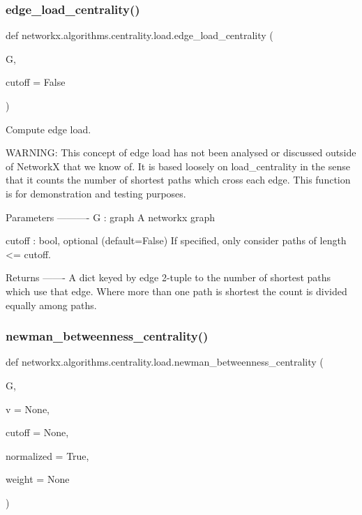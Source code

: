 \subsubsection{\texorpdfstring{edge\+\_\+load\+\_\+centrality()}{edge\_load\_centrality()}}
{\footnotesize\ttfamily def networkx.\+algorithms.\+centrality.\+load.\+edge\+\_\+load\+\_\+centrality (\begin{DoxyParamCaption}\item[{}]{G,  }\item[{}]{cutoff = {\ttfamily False} }\end{DoxyParamCaption})}

\begin{DoxyVerb}Compute edge load.

WARNING: This concept of edge load has not been analysed
or discussed outside of NetworkX that we know of.
It is based loosely on load_centrality in the sense that
it counts the number of shortest paths which cross each edge.
This function is for demonstration and testing purposes.

Parameters
----------
G : graph
    A networkx graph

cutoff : bool, optional (default=False)
    If specified, only consider paths of length <= cutoff.

Returns
-------
A dict keyed by edge 2-tuple to the number of shortest paths
which use that edge. Where more than one path is shortest
the count is divided equally among paths.
\end{DoxyVerb}
 \mbox{\label{namespacenetworkx_1_1algorithms_1_1centrality_1_1load_aa6e723e954aa51a2258ec99854f063c0}} 
\subsubsection{\texorpdfstring{newman\+\_\+betweenness\+\_\+centrality()}{newman\_betweenness\_centrality()}}
{\footnotesize\ttfamily def networkx.\+algorithms.\+centrality.\+load.\+newman\+\_\+betweenness\+\_\+centrality (\begin{DoxyParamCaption}\item[{}]{G,  }\item[{}]{v = {\ttfamily None},  }\item[{}]{cutoff = {\ttfamily None},  }\item[{}]{normalized = {\ttfamily True},  }\item[{}]{weight = {\ttfamily None} }\end{DoxyParamCaption})}

